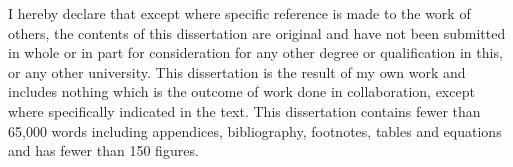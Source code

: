 
\begin{declaration}

I hereby declare that except where specific reference is made to the work of others, the contents of this dissertation are original and have not been submitted in whole or in part for consideration for any other degree or qualification in this, or any other university. This dissertation is the result of my own work and includes nothing which is the outcome of work done in collaboration, except where specifically indicated in the text. This dissertation contains fewer than 65,000 words including appendices, bibliography, footnotes, tables and equations and has fewer than 150 figures.


\end{declaration}


